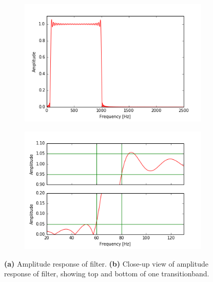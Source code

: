 \begin{figure}[h]
\centering
\begin{subfigure}{0.49\textwidth}
\centering
\includegraphics[width=\textwidth]{figures/filtertest/freq_response1.png}
\caption{}
\label{fig:freq_filt1}
\end{subfigure}
\begin{subfigure}{0.49\textwidth}
\centering
\includegraphics[width=\textwidth]{figures/filtertest/freq_response2.png}
\caption{}
\label{fig:freq_filt2}
\end{subfigure}
\caption{\textbf{(a)} Amplitude response of filter. \textbf{(b)} Close-up view of amplitude response of filter, showing top and bottom of one transitionband.}
\label{fig:freq_filt}
\end{figure}

